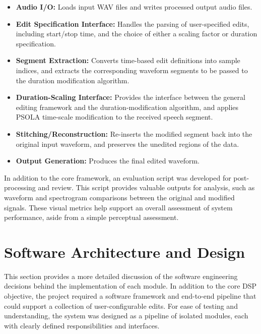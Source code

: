 \documentclass{article}
\begin{document}
\begin{itemize}
  \item \textbf{Audio I/O:} Loads input WAV files and writes processed output audio files.
  
  \item \textbf{Edit Specification Interface:} Handles the parsing of user-specified edits, including start/stop time, and the choice of either a scaling factor or duration specification.
  
  \item \textbf{Segment Extraction:} Converts time-based edit definitions into sample indices, and extracts the corresponding waveform segments to be passed to the duration modification algorithm.
  
  \item \textbf{Duration-Scaling Interface:} Provides the interface between the general editing framework and the duration-modification algorithm, and applies PSOLA time-scale modification to the received speech segment.
  
  \item \textbf{Stitching/Reconstruction:} Re-inserts the modified segment back into the original input waveform, and preserves the unedited regions of the data.
  
  \item \textbf{Output Generation:} Produces the final edited waveform.
\end{itemize}

In addition to the core framework, an evaluation script was developed for post-processing and review. This script provides valuable outputs for analysis, such as waveform and spectrogram comparisons between the original and modified signals. These visual metrics help support an overall assessment of system performance, aside from a simple perceptual assessment.

\section{Software Architecture and Design}

This section provides a more detailed discussion of the software engineering decisions behind the implementation of each module. In addition to the core DSP objective, the project required a software framework and end-to-end pipeline that could support a collection of user-configurable edits. For ease of testing and understanding, the system was designed as a pipeline of isolated modules, each with clearly defined responsibilities and interfaces.
\end{document}
